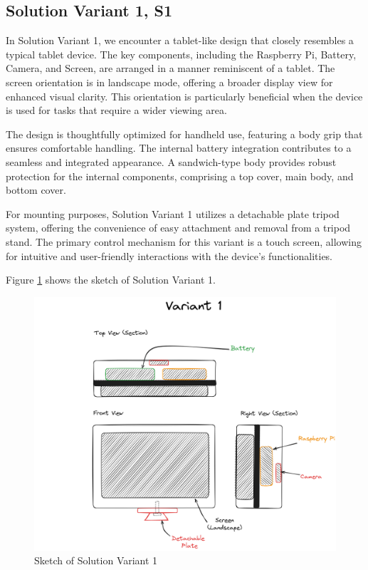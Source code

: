 \subsection{Solution Variant 1, S1}
In Solution Variant 1, we encounter a tablet-like design that closely resembles a typical tablet device. The key components, including the Raspberry Pi, Battery, Camera, and Screen, are arranged in a manner reminiscent of a tablet. The screen orientation is in landscape mode, offering a broader display view for enhanced visual clarity. This orientation is particularly beneficial when the device is used for tasks that require a wider viewing area.

The design is thoughtfully optimized for handheld use, featuring a body grip that ensures comfortable handling. The internal battery integration contributes to a seamless and integrated appearance. A sandwich-type body provides robust protection for the internal components, comprising a top cover, main body, and bottom cover.

For mounting purposes, Solution Variant 1 utilizes a detachable plate tripod system, offering the convenience of easy attachment and removal from a tripod stand. The primary control mechanism for this variant is a touch screen, allowing for intuitive and user-friendly interactions with the device's functionalities.

Figure \ref{fig:sketch-solution-variant-1} shows the sketch of Solution Variant 1.

\begin{figure}[H]
    \centering
    \includegraphics[width=0.75\linewidth]{texs/Part1/chapter3/image/v1.png}
    \caption{Sketch of Solution Variant 1}
    \label{fig:sketch-solution-variant-1}
\end{figure}


